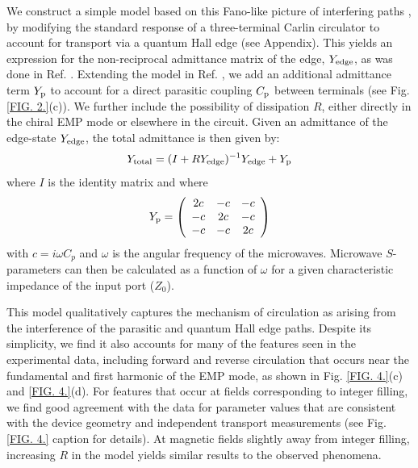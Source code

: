 We construct a simple model based on this Fano-like picture of interfering paths \cite{miroshnichenko2010fano}, by modifying the standard response of a three-terminal Carlin circulator to account for transport via a quantum Hall edge (see Appendix). This yields an expression for the non-reciprocal admittance matrix of the edge, $Y_{\rm edge}$, as was done in Ref. \cite{PhysRevX.4.021019}. Extending the model in Ref. \cite{PhysRevX.4.021019}, we add an additional admittance term $Y_{\rm p}$ to account for a direct parasitic coupling $C_{\rm p}$ between terminals (see Fig. \ref{FIG. 2.}(c)). We further include the possibility of dissipation $R$, either directly in the chiral EMP mode or elsewhere in the circuit. Given an admittance of the edge-state $Y_{\rm edge}$, the total admittance is then given by:
\begin{equation}
	{Y_{{\rm{total}}}} = {({I} + R  Y_{\rm edge})^{ - 1}}Y_{\rm edge} + {Y_{{\rm{p}}}}
\end{equation}
where $I$ is the identity matrix and where
\[ {Y_{{\rm{p}}}} = \left( {\begin{array}{*{20}{c}}
{2c}&{ - c}&{ - c}\\
{ - c}&{2c}&{ - c}\\
{ - c}&{ - c}&{2c}
\end{array}} \right)\]
with $c = i\omega {C_p}$ and $\omega$ is the angular frequency of the microwaves. Microwave $S$-parameters can then be calculated as a function of $\omega$ for a given characteristic impedance of the input port ($Z_0$).

This model qualitatively captures the mechanism of circulation as arising from the interference of the parasitic and quantum Hall edge paths. Despite its simplicity, we find it also accounts for many of the features seen in the experimental data, including forward and reverse circulation that occurs near the fundamental and first harmonic of the EMP mode, as shown in Fig. \ref{FIG. 4.}(c) and \ref{FIG. 4.}(d). For features that occur at fields corresponding to integer filling, we find good agreement with the data for parameter values that are consistent with the device geometry and independent transport measurements (see Fig. \ref{FIG. 4.} caption for details). At magnetic fields slightly away from integer filling, increasing $R$ in the model yields similar results to the observed phenomena.

